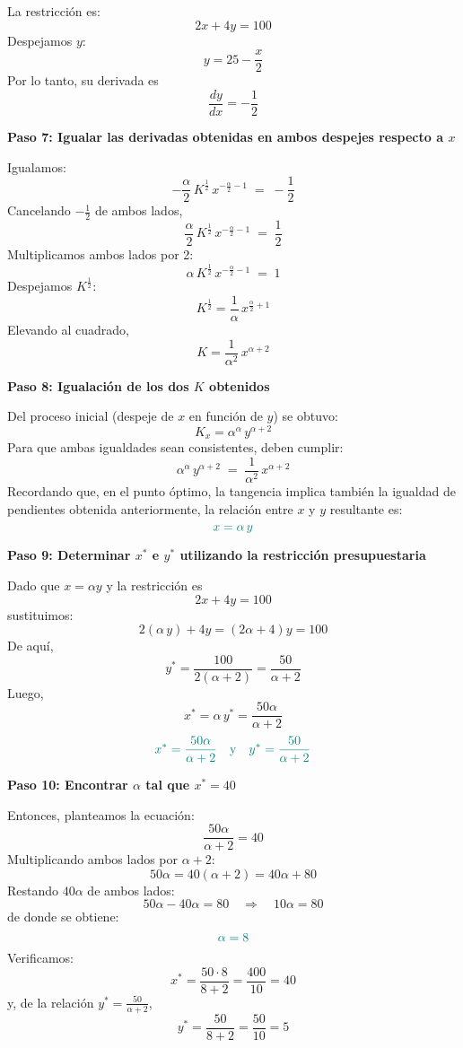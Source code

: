 \documentclass{article}
\begin{document}
    La restricción es:
    \[
    2x + 4y = 100
    \]
    Despejamos \(y\):
    \[
    y = 25 - \frac{x}{2}
    \]
    Por lo tanto, su derivada es
    \[
    \frac{dy}{dx} = -\frac{1}{2}
    \]
    
    \bigskip
    \textbf{Paso 7: Igualar las derivadas obtenidas en ambos despejes respecto a \(x\)}
    
    Igualamos:
    \[
    -\frac{\alpha}{2}\,K^{\frac{1}{2}}\, x^{-\frac{\alpha}{2}-1} \;=\; -\frac{1}{2}
    \]
    Cancelando \(-\frac{1}{2}\) de ambos lados,
    \[
    \frac{\alpha}{2}\,K^{\frac{1}{2}}\, x^{-\frac{\alpha}{2}-1} \;=\; \frac{1}{2}
    \]
    Multiplicamos ambos lados por 2:
    \[
    \alpha\,K^{\frac{1}{2}}\, x^{-\frac{\alpha}{2}-1} \;=\; 1
    \]
    Despejamos \(K^{\frac{1}{2}}\):
    \[
    K^{\frac{1}{2}} = \frac{1}{\alpha}\, x^{\frac{\alpha}{2}+1}
    \]
    Elevando al cuadrado,
    \[
    K = \frac{1}{\alpha^2}\, x^{\alpha+2}
    \]
    
    \bigskip
    \textbf{Paso 8: Igualación de los dos \(K\) obtenidos}
    
    Del proceso inicial (despeje de \(x\) en función de \(y\)) se obtuvo:
    \[
    K_x = \alpha^\alpha\, y^{\alpha+2}
    \]
    Para que ambas igualdades sean consistentes, deben cumplir:
    \[
    \alpha^\alpha\, y^{\alpha+2} \;=\; \frac{1}{\alpha^2}\, x^{\alpha+2}
    \]
    Recordando que, en el punto óptimo, la tangencia implica también la igualdad de pendientes obtenida anteriormente, la relación entre \(x\) y \(y\) resultante es:
    \[ \color{teal}
    x = \alpha\,y
    \]
    
    \bigskip
    \textbf{Paso 9: Determinar \(x^*\) e \(y^*\) utilizando la restricción presupuestaria}
    
    Dado que \(x=\alpha y\) y la restricción es
    \[
    2x+4y=100
    \]
    sustituimos:
    \[
    2(\alpha\,y)+4y = (2\alpha+4)y = 100
    \]
    De aquí,
    \[
    y^* = \frac{100}{2(\alpha+2)} = \frac{50}{\alpha+2}
    \]
    Luego,
    \[
    x^* = \alpha\,y^* = \frac{50\alpha}{\alpha+2}
    \]
    \[
    \color{teal}{x^*=\frac{50\alpha}{\alpha+2} \quad \text{y} \quad y^*=\frac{50}{\alpha+2}}
    \]
    
    \bigskip
    \textbf{Paso 10: Encontrar \(\alpha\) tal que \(x^*=40\)}
    
    Entonces, planteamos la ecuación:
    \[
    \frac{50\alpha}{\alpha+2}=40
    \]
    Multiplicando ambos lados por \(\alpha+2\):
    \[
    50\alpha = 40(\alpha+2)=40\alpha+80
    \]
    Restando \(40\alpha\) de ambos lados:
    \[
    50\alpha-40\alpha=80 \quad\Longrightarrow\quad 10\alpha=80
    \]
    de donde se obtiene:
    \[\color{teal}
    \alpha=8
    \]
    Verificamos:
    \[
    x^*=\frac{50\cdot 8}{8+2}=\frac{400}{10}=40
    \]
    y, de la relación \(y^*=\frac{50}{\alpha+2}\),
    \[
    y^*=\frac{50}{8+2}=\frac{50}{10}=5
    \]
    
\end{document}
